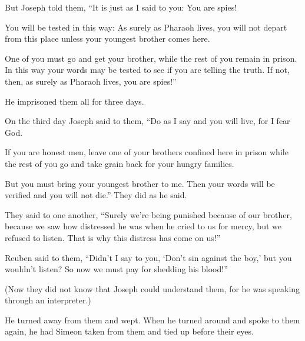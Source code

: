 \begin{scripture}
 But Joseph told them, ``It is just as I said to you: You are spies!
 You will be tested in this way: As surely as Pharaoh lives, you will not depart from this place unless your youngest brother comes here.
 One of you must go and get your brother, while the rest of you remain in prison. In this way your words may be tested to see if you are telling the truth. If not, then, as surely as Pharaoh lives, you are spies!''
 He imprisoned them all for three days.
 On the third day Joseph said to them, ``Do as I say and you will live, for I fear God.
 If you are honest men, leave one of your brothers confined here in prison while the rest of you go and take grain back for your hungry families.
 But you must bring your youngest brother to me. Then your words will be verified and you will not die.'' They did as he said.
\everypar{}

 They said to one another, ``Surely we're being punished because of our brother, because we saw how distressed he was when he cried to us for mercy, but we refused to listen. That is why this distress has come on us!''
 Reuben said to them, ``Didn't I say to you, `Don't sin against the boy,' but you wouldn't listen? So now we must pay for shedding his blood!''
 (Now they did not know that Joseph could understand them, for he was speaking through an interpreter.)
 He turned away from them and wept. When he turned around and spoke to them again, he had Simeon taken from them and tied up before their eyes.
\everypar{}


\end{scripture}
